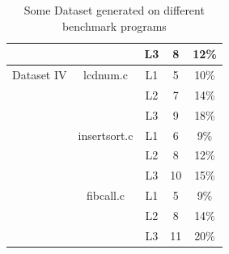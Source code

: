 \begin{table}
{\begin{tabular}{|c|c|c|c|c|}
             &              & L3 & 8 & 12\% \\ \hline
 Dataset IV  & lcdnum.c & L1 & 5 & 10\% \\
             &          & L2 & 7 & 14\% \\
             &          & L3 & 9 & 18\% \\
             & insertsort.c & L1 & 6 & 9\% \\
             &              & L2 & 8 & 12\% \\
             &              & L3 & 10 & 15\% \\
             & fibcall.c & L1 & 5 & 9\% \\
             &           & L2 & 8 & 14\% \\
             &           & L3 & 11 & 20\% \\ \hline
 \end{tabular}
 }
 \caption{Some Dataset generated on different benchmark programs}
 \label{tab12}
\end{table}




